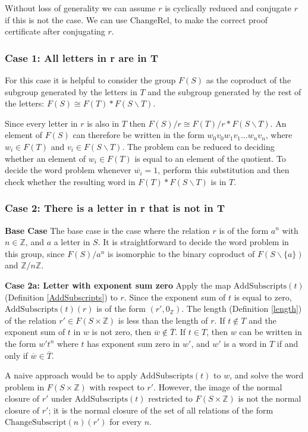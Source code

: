 \documentclass[12pt]{article} %
\theoremstyle{definition}
\theoremstyle{definition}
\theoremstyle{definition}
\theoremstyle{definition}
\theoremstyle{definition}
\theoremstyle{definition}
\begin{document}
Without loss of generality we can assume $r$ is cyclically reduced and
conjugate $r$ if this is not the case. We can use $\text{ChangeRel}$,
to make the correct proof certificate after conjugating $r$.

\subsubsection{Case 1: All letters in r are in T}\label{allinT}
For this case it is helpful to consider the group $F(S)$ as the
coproduct of the subgroup generated by the letters in $T$ and
the subgroup generated by the rest of the letters:
$F(S) \cong F(T) \ast F(S \backslash T)$.

Since every letter in $r$ is also in $T$ then $F(S) / r \cong F(T) / r \ast F(S \backslash T)$.
An element of $F(S)$ can therefore be written in the form
$w_0v_0w_1v_1 \dots w_nv_n$, where $w_i \in F(T)$ and $v_i \in F(S \backslash T)$.
The problem can be reduced to deciding whether an element of $w_i \in F(T)$ is equal to an element of the quotient.
To decide the word problem whenever $\overline{w_i} = 1$, perform this substitution and
then check whether the resulting word in $F(T) \ast F(S \backslash T)$ is in $T$.

\subsubsection{Case 2: There is a letter in r that is not in T}\label{xandt}
\textbf{Base Case}
The base case is the case where the relation $r$ is of the form $a^n$ with
$n \in \mathbb{Z}$, and $a$ a letter in $S$. It is straightforward to decide
the word problem in this group, since $F(S) / a^n$ is isomorphic
to the binary coproduct of $F(S \backslash \{a\})$ and $\mathbb{Z}/n\mathbb{Z}$.

\textbf{Case 2a: Letter with exponent sum zero}\label{expsumzero}
Apply the map $\text{AddSubscripts}(t)$ (Definition \ref{AddSubscripts}) to $r$.
Since the exponent sum of $t$ is equal to zero, $\text{AddSubscripts}(t)(r)$ is
of the form $(r', 0_\mathbb{Z})$.
The length (Definition \ref{length}) of the relation $r' \in F(S \times \mathbb{Z})$
is less than the length of $r$.
If $t \notin T$ and the exponent sum of $t$ in $w$ is not zero,
then $\overline{w} \notin \overline{T}$.
If $t \in T$, then $w$ can be written in the
form $w' t^n$ where $t$ has exponent sum zero in $w'$, and $w'$ is a word in $T$ if
and only if $\overline{w} \in \overline{T}$.

A naive approach would be to apply $\text{AddSubscripts}(t)$ to $w$, and solve the word
problem in $F(S \times \mathbb{Z})$ with respect to $r'$. However, the image of the normal closure of $r'$ under $\text{AddSubscripts}(t)$ restricted
to $F(S \times \mathbb{Z})$ is not the normal closure of $r'$; it is the normal closure of
the set of all relations of the form $\text{ChangeSubscript}(n)(r')$ for every $n$.
\end{document}
